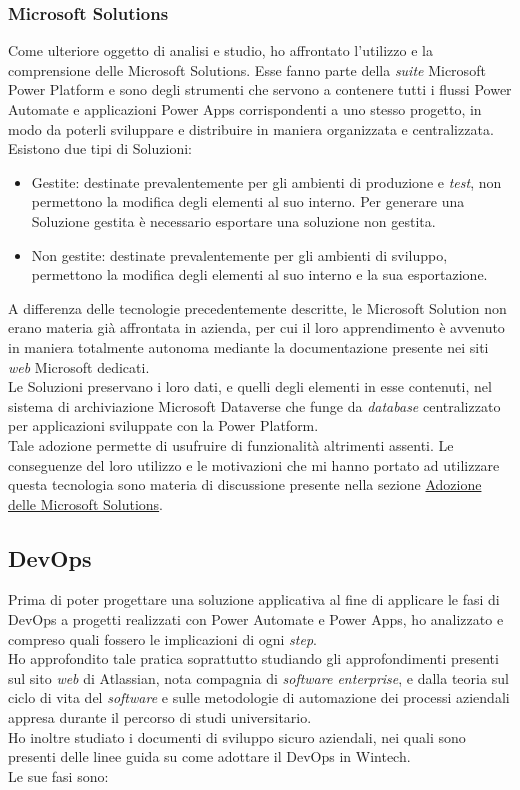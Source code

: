 \newpage \subsubsection*{Microsoft Solutions}
Come ulteriore oggetto di analisi e studio, ho affrontato l'utilizzo e la comprensione delle Microsoft Solutions.
Esse fanno parte della \emph{suite} Microsoft Power Platform e sono degli strumenti che servono a contenere tutti i flussi Power Automate e applicazioni Power Apps corrispondenti a uno stesso progetto, in modo da poterli sviluppare e distribuire in maniera organizzata e centralizzata.\\
Esistono due tipi di Soluzioni: 
\begin{itemize}
    \item Gestite: destinate prevalentemente per gli ambienti di produzione e \emph{test}, non permettono la modifica degli elementi al suo interno. Per generare una Soluzione gestita è necessario esportare una soluzione non gestita.
    \item Non gestite: destinate prevalentemente per gli ambienti di sviluppo, permettono la modifica degli elementi al suo interno e la sua esportazione.
\end{itemize}
A differenza delle tecnologie precedentemente descritte, le Microsoft Solution non erano materia già affrontata in azienda, per cui il loro apprendimento è avvenuto in maniera totalmente autonoma mediante la documentazione presente nei siti \emph{web} Microsoft dedicati.\\
Le Soluzioni preservano i loro dati, e quelli degli elementi in esse contenuti, nel sistema di archiviazione Microsoft Dataverse che funge da \emph{database} centralizzato per applicazioni sviluppate con la Power Platform.\\
Tale adozione permette di usufruire di funzionalità altrimenti assenti.
Le conseguenze del loro utilizzo e le motivazioni che mi hanno portato ad utilizzare questa tecnologia sono materia di discussione presente nella sezione \hyperref[progettazioneSolutions]{Adozione delle Microsoft Solutions}.\\

\subsection{DevOps}
Prima di poter progettare una soluzione applicativa al fine di applicare le fasi di \gls{DevOps} a progetti realizzati con Power Automate e Power Apps, ho analizzato e compreso quali fossero le implicazioni di ogni \emph{step}.\\
Ho approfondito tale pratica soprattutto studiando gli approfondimenti presenti sul sito \emph{web} di Atlassian, nota compagnia di \emph{software enterprise}, e dalla teoria sul ciclo di vita del \emph{software} e sulle metodologie di automazione dei processi aziendali appresa durante il percorso di studi universitario.\\
Ho inoltre studiato i documenti di sviluppo sicuro aziendali, nei quali sono presenti delle linee guida su come adottare il \gls{DevOps} in Wintech.\\
Le sue fasi sono:
